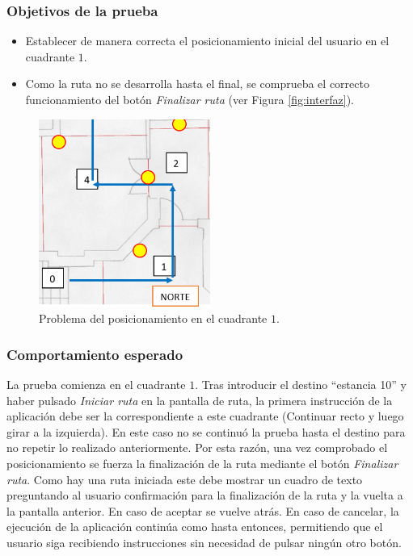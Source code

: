\subsubsection*{Objetivos de la prueba}

\begin{itemize}
	\item Establecer de manera correcta el posicionamiento inicial del usuario en el cuadrante $1$.
	
	\item Como la ruta no se desarrolla hasta el final, se comprueba el correcto funcionamiento del botón \textit{Finalizar ruta} (ver Figura \ref{fig:interfaz}).
\end{itemize}


\begin{figure}[t]
	\centering
	\includegraphics[width=0.5\textwidth]{Imagenes/Evaluacion/posic1}
	\caption{Problema del posicionamiento en el cuadrante $1$.}
	\label{fig:posic1}
\end{figure}

\subsubsection*{Comportamiento esperado}

La prueba comienza en el cuadrante $1$. Tras introducir el destino ``estancia 10'' y haber pulsado \textit{Iniciar ruta} en la pantalla de ruta, la primera instrucción de la aplicación debe ser la correspondiente a este cuadrante (Continuar recto y luego girar a la izquierda). En este caso no se continuó la prueba hasta el destino para no repetir lo realizado anteriormente. Por esta razón, una vez comprobado el posicionamiento se fuerza la finalización de la ruta mediante el botón \textit{Finalizar ruta}. Como hay una ruta iniciada este debe mostrar un cuadro de texto preguntando al usuario confirmación para la finalización de la ruta y la vuelta a la pantalla anterior. En caso de aceptar se vuelve atrás. En caso de cancelar, la ejecución de la aplicación continúa como hasta entonces, permitiendo que el usuario siga recibiendo instrucciones sin necesidad de pulsar ningún otro botón.


